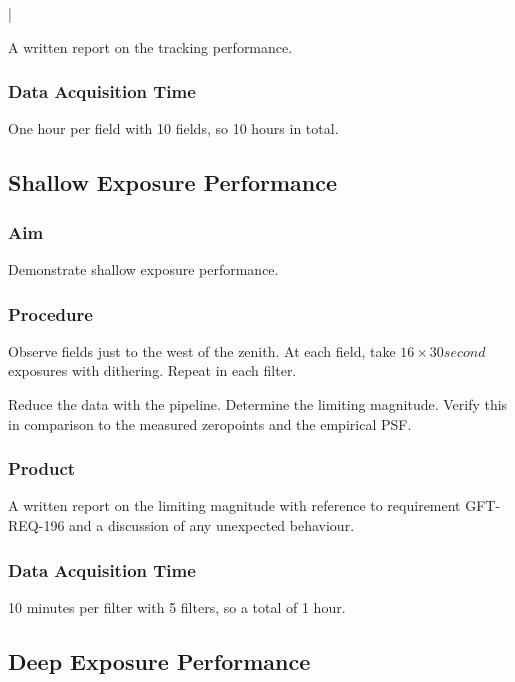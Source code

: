 |\documentclass{article}
\begin{document}
A written report on the tracking performance.

\subsubsection{Data Acquisition Time}

One hour per field with 10 fields, so 10 hours in total.


\subsection{Shallow Exposure Performance}

\subsubsection{Aim}

Demonstrate shallow exposure performance.

\subsubsection{Procedure}

Observe fields just to the west of the zenith. At each field, take $16 \times 30 second$ exposures with dithering. Repeat in each filter.

Reduce the data with the pipeline. Determine the limiting magnitude. Verify this in comparison to the measured zeropoints and the empirical PSF.

\subsubsection{Product}

A written report on the limiting magnitude with reference to requirement GFT-REQ-196 and a discussion of any unexpected behaviour.

\subsubsection{Data Acquisition Time}

10 minutes per filter with 5 filters, so a total of 1 hour.


\subsection{Deep Exposure Performance}
\end{document}
